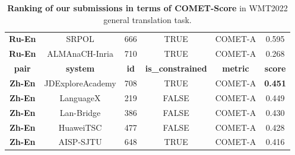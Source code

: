 \documentclass[11pt,a4paper]{article}
\begin{document}
\begin{table*}[t]
{\begin{tabular}{cccccc}
    \textbf{Ru-En} & SRPOL               & 666         & TRUE                    & COMET-A         & 0.595          \\
    \textbf{Ru-En} & ALMAnaCH-Inria      & 710         & TRUE                    & COMET-A         & 0.268          \\\hline
    \textbf{pair}  & \textbf{system}     & \textbf{id} & \textbf{is\_constrained} & \textbf{metric} & \textbf{score} \\\hline
    \textbf{Zh-En} & JDExploreAcademy    & 708         & TRUE                    & COMET-A         & \textbf{0.451} \\
    \textbf{Zh-En} & LanguageX           & 219         & FALSE                   & COMET-A         & 0.449          \\
    \textbf{Zh-En} & Lan-Bridge          & 386         & FALSE                   & COMET-A         & 0.430          \\
    \textbf{Zh-En} & HuaweiTSC           & 477         & FALSE                   & COMET-A         & 0.428          \\
    \textbf{Zh-En} & AISP-SJTU           & 648         & TRUE                    & COMET-A         & 0.416          \\
    \bottomrule
    \end{tabular}}
    \caption{\label{tab:comet_more} \textbf{Ranking of our submissions in terms of COMET-Score} in WMT2022 general translation task.}
\end{table*}







\end{document}
